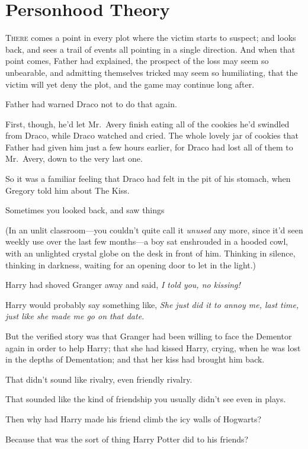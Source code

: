 \chapter{Personhood Theory}

\lettrine{T}{here} comes a
point in every plot where the victim starts to suspect; and looks back, and
sees a trail of events all pointing in a single direction. And when that point
comes, Father had explained, the prospect of the loss may seem so unbearable,
and admitting themselves tricked may seem so humiliating, that the victim will
yet deny the plot, and the game may continue long after.

Father had warned Draco not to do that again.

First, though, he'd let Mr.~Avery finish eating all of the cookies he'd
swindled from Draco, while Draco watched and cried. The whole lovely jar of
cookies that Father had given him just a few hours earlier, for Draco had lost
all of them to Mr.~Avery, down to the very last one.

So it was a familiar feeling that Draco had felt in the pit of his stomach,
when Gregory told him about The Kiss.

Sometimes you looked back, and saw things{\el}

(In an unlit classroom---you couldn't quite call it \emph{unused} any more,
since it'd seen weekly use over the last few months---a boy sat enshrouded in a
hooded cowl, with an unlighted crystal globe on the desk in front of him.
Thinking in silence, thinking in darkness, waiting for an opening door to let
in the light.)

Harry had shoved Granger away and said, \emph{I told you, no kissing!}

Harry would probably say something like, \emph{She just did it to annoy me,
last time, just like she made me go on that date.}

But the verified story was that Granger had been willing to face the Dementor
again in order to help Harry; that she had kissed Harry, crying, when he was
lost in the depths of Dementation; and that her kiss had brought him back.

That didn't sound like rivalry, even friendly rivalry.

That sounded like the kind of friendship you usually didn't see even in plays.

Then why had Harry made his friend climb the icy walls of Hogwarts?

Because that was the sort of thing Harry Potter did to his friends?

